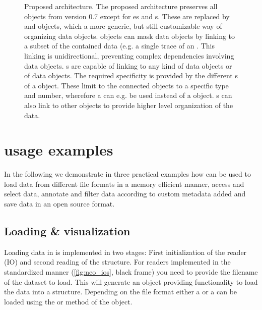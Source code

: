 \begin{figure}
    \centering
    
    \caption[Proposed  architecture]{Proposed  architecture. The proposed  architecture preserves all objects from  version 0.7 except for es and s. These are replaced by  and  objects, which a more generic, but still customizable way of organizing data objects.  objects can mask data objects by linking to a subset of the contained data (e.g. a single trace of an . This linking is unidirectional, preventing complex dependencies involving data objects. s are capable of linking to any kind of data objects or  of data objects. The required specificity is provided by the different s of a  object. These limit to the connected objects to a specific type and number, wherefore a  can e.g. be used instead of a  object. s can also link to other  objects to provide higher level organization of the data.}
    \label{fig:neo_architecture_future}
\end{figure}


\section{ usage examples}
In the following we demonstrate in three practical examples how  can be used to load data from different file formats in a memory efficient manner, access and select data, annotate and filter data according to custom metadata added and save data in an open source format.

\subsection{Loading \& visualization}
Loading data in  is implemented in two stages: First initialization of the reader (IO) and second reading of the  structure. For readers implemented in the standardized manner (\cref{fig:neo_ios}, black frame) you need to provide the filename of the dataset to load. This will generate an  object providing functionality to load the data into a  structure. Depending on the file format either a   or a   can be loaded using the  or  method of the  object.

